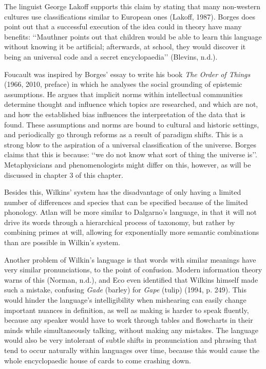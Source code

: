 The linguist George Lakoff supports this claim by stating that many non-western cultures use classifications similar to European ones (Lakoff, 1987). Borges does point out that a successful execution of the idea could in theory have many benefits: ‘‘Mauthner points out that children would be able to learn this language without knowing it be artificial; afterwards, at school, they would discover it being an universal code and a secret encyclopaedia’’ (Blevins, n.d.). 

Foucault was inspired by Borges’ essay to write his book \textit{The Order of Things} (1966, 2010, preface) in which he analyses the social grounding of epistemic assumptions. He argues that implicit norms within intellectual communities determine thought and influence which topics are researched, and which are not, and how the established bias influences the interpretation of the data that is found. These assumptions and norms are bound to cultural and historic settings, and periodically go through reforms as a result of paradigm shifts. This is a strong blow to the aspiration of a universal classification of the universe. Borges claims that this is because: ‘‘we do not know what sort of thing the universe is’’. Metaphysicians and phenomenologists might differ on this, however, as will be discussed in chapter 3 of this chapter.  

Besides this, Wilkins’ system has the disadvantage of only having a limited number of differences and species that can be specified because of the limited phonology. Atlan will be more similar to Dalgarno’s language, in that it will not drive its words through a hierarchical process of taxonomy, but rather by combining primes at will, allowing for exponentially more semantic combinations than are possible in Wilkin’s system. 

Another problem of Wilkin’s language is that words with similar meanings have very similar pronunciations, to the point of confusion. Modern information theory warns of this (Norman, n.d.), and Eco even identified that Wilkins himself made such a mistake, confusing {\it Gade} (barley) for {\it Gape} (tulip) (1994, p. 249). This would hinder the language’s intelligibility when mishearing can easily change important nuances in definition, as well as making is harder to speak fluently, because any speaker would have to work through tables and flowcharts in their minds while simultaneously talking, without making any mistakes. The language would also be very intolerant of subtle shifts in pronunciation and phrasing that tend to occur naturally within languages over time, because this would cause the whole encyclopaedic house of cards to come crashing down. 

